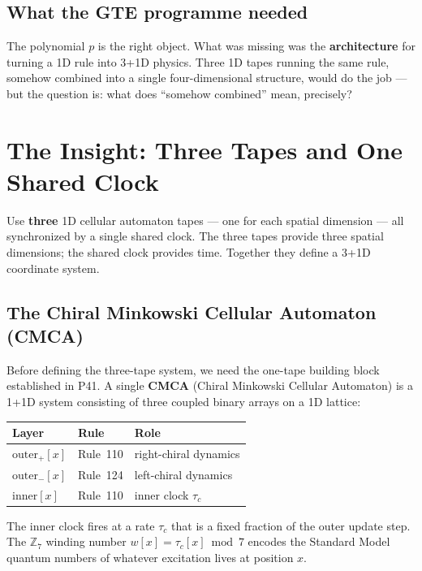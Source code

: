 \documentclass[11pt,a4paper]{article}
\newcommand{\term}[1]{\textbf{#1}}
\begin{document}
\subsection{What the GTE programme needed}

The polynomial $p$ is the right object.  What was missing was the
\term{architecture} for turning a 1D rule into 3+1D physics.
Three 1D tapes running the same rule, somehow combined into a single
four-dimensional structure, would do the job --- but the question is:
what does ``somehow combined'' mean, precisely?

\section{The Insight: Three Tapes and One Shared Clock}
\label{sec:insight}

\begin{tcolorbox}[colback=boxblue,colframe=blue!40!black,title=The key idea]
Use \textbf{three} 1D cellular automaton tapes --- one for each spatial
dimension --- all synchronized by a single shared clock.  The three tapes
provide three spatial dimensions; the shared clock provides time.
Together they define a 3+1D coordinate system.
\end{tcolorbox}

\subsection{The Chiral Minkowski Cellular Automaton (CMCA)}

Before defining the three-tape system, we need the one-tape building block
established in P41.  A single \term{CMCA} (Chiral Minkowski Cellular
Automaton) is a 1+1D system consisting of three coupled binary arrays on a
1D lattice:
\begin{center}
\begin{tabular}{lll}
\toprule
Layer & Rule & Role \\
\midrule
$\mathrm{outer}_+[x]$ & Rule~110 & right-chiral dynamics \\
$\mathrm{outer}_-[x]$ & Rule~124 & left-chiral dynamics \\
$\mathrm{inner}[x]$   & Rule~110 & inner clock $\tau_c$ \\
\bottomrule
\end{tabular}
\end{center}
The inner clock fires at a rate $\tau_c$ that is a fixed fraction of the
outer update step.  The $\mathbb{Z}_7$ winding number $w[x] = \tau_c[x]
\bmod 7$ encodes the Standard Model quantum numbers of whatever excitation
lives at position $x$.
\end{document}
